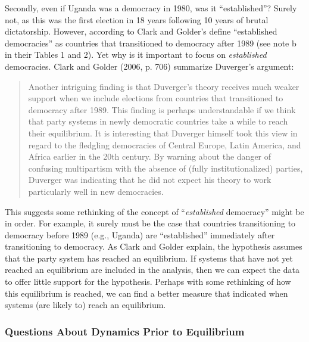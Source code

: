\documentclass[12pt]{article}
\begin{document}
Secondly, even if Uganda was a democracy in 1980, was it ``established''? Surely not, as this was the first election in 18 years following 10 years of brutal dictatorship. However, according to Clark and Golder's define ``established democracies'' as countries that transitioned to democracy after 1989 (see note b in their Tables 1 and 2). Yet why is it important to focus on \textit{established} democracies. Clark and Golder (2006, p. 706) summarize Duverger's argument: 

\begin{quote}
Another intriguing finding is that Duverger's theory receives much weaker support when we include elections from countries that transitioned to democracy after 1989. This finding is perhaps understandable if we think that party systems in newly democratic countries take a while to reach their equilibrium. It is interesting that Duverger himself took this view in regard to the fledgling democracies of Central Europe, Latin America, and Africa earlier in the 20th century. By warning about the danger of confusing multipartism with the absence of (fully institutionalized) parties, Duverger was indicating that he did not expect his theory to work particularly well in new democracies. 
\end{quote}

This suggests some rethinking of the concept of ``\textit{established} democracy'' might be in order. For example, it surely must be the case that countries transitioning to democracy before 1989 (e.g., Uganda) are ``established'' immediately after transitioning to democracy. As Clark and Golder explain, the hypothesis assumes that the party system has reached an equilibrium. If systems that have not yet reached an equilibrium are included in the analysis, then we can expect the data to offer little support for the hypothesis. Perhaps with some rethinking of how this equilibrium is reached, we can find a better measure that indicated when systems (are likely to) reach an equilibrium.


\subsubsection*{Questions About Dynamics Prior to Equilibrium}
\end{document}
